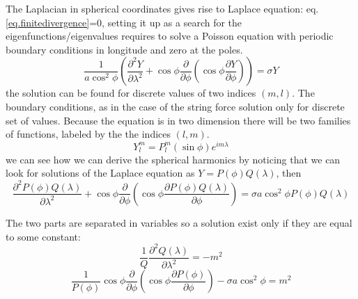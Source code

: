 

The Laplacian in spherical coordinates gives rise to Laplace equation: eq.\ref{eq.finitedivergence}=0, setting it up as a search for the eigenfunctions/eigenvalues requires to solve a Poisson equation with periodic boundary conditions in longitude and zero at the poles. 
\begin{equation}\label{eq.sphericalhar}
    \frac{1}{a\cos^2\phi}\left(\frac{\partial^2Y}{\partial\lambda^2}+\cos\phi\frac{\partial}{\partial\phi}\left(\cos\phi\frac{\partial Y}{\partial\phi}\right)\right)=\sigma Y
\end{equation}
the solution can be found for discrete values of two indices $(m,l)$. 
The boundary conditions, as in the case of the string force solution only for
discrete set of values. Because the equation is in two dimension there will
be two families of functions, labeled by the the indices $(l,m)$.
\begin{equation}
    Y_l^m=P_l^m(\sin\phi)e^{im\lambda}
\end{equation}
we can see how we can derive the spherical harmonics by noticing that we can look for solutions of the Laplace equation as $Y=P(\phi)Q(\lambda)$, then
$$\frac{\partial^2P(\phi)Q(\lambda)}{\partial\lambda^2}+\cos\phi\frac{\partial}{\partial\phi}\left(\cos\phi\frac{\partial P(\phi)Q(\lambda)}{\partial\phi}\right)=\sigma a\cos^2\phi P(\phi)Q(\lambda)$$


The two parts are separated in variables so a solution exist
only if they are equal to some constant:
$$\frac{1}{Q}\frac{\partial^2Q(\lambda)}{\partial\lambda^2}=-m^2$$
$$\frac{1}{P(\phi)}\cos\phi\frac{\partial}{\partial\phi}\left(\cos\phi\frac{\partial P(\phi)}{\partial\phi}\right)-\sigma a\cos^2\phi=m^2$$

